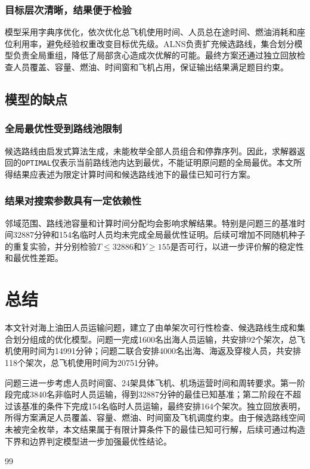 \documentclass[UTF-8,a4paper,zihao=-4]{ctexart}
\begin{document}
\subsubsection{目标层次清晰，结果便于检验}
模型采用字典序优化，依次优化总飞机使用时间、人员总在途时间、燃油消耗和座位利用率，避免经验权重改变目标优先级。ALNS负责扩充候选路线，集合划分模型负责全局重组，降低了局部贪心造成次优解的可能。最终方案还通过独立回放检查人员覆盖、容量、燃油、时间窗和飞机占用，保证输出结果满足题目约束。

\subsection{模型的缺点}
\subsubsection{全局最优性受到路线池限制}
候选路线由启发式算法生成，未能枚举全部人员组合和停靠序列。因此，求解器返回的\texttt{OPTIMAL}仅表示当前路线池内达到最优，不能证明原问题的全局最优。本文所得结果应表述为限定计算时间和候选路线池下的最佳已知可行方案。

\subsubsection{结果对搜索参数具有一定依赖性}
邻域范围、路线池容量和计算时间分配均会影响求解结果。特别是问题三的基准时间$32887$分钟和154名临时人员均未完成全局最优性证明。后续可增加不同随机种子的重复实验，并分别检验$T\leq32886$和$Y\geq155$是否可行，以进一步评价解的稳定性和最优性差距。

\section{总结}
本文针对海上油田人员运输问题，建立了由单架次可行性检查、候选路线生成和集合划分组成的优化模型。问题一完成1600名出海人员运输，共安排92个架次，总飞机使用时间为14991分钟；问题二联合安排4000名出海、海返及穿梭人员，共安排118个架次，总飞机使用时间为20751分钟。

问题三进一步考虑人员时间窗、24架具体飞机、机场运营时间和周转要求。第一阶段完成3840名非临时人员运输，得到32887分钟的最佳已知基准；第二阶段在不超过该基准的条件下完成154名临时人员运输，最终安排164个架次。独立回放表明，所得方案满足人员覆盖、容量、燃油、时间窗及飞机调度约束。由于候选路线空间未被完全枚举，本文结果属于有限计算条件下的最佳已知可行解，后续可通过构造下界和边界判定模型进一步加强最优性结论。

\begin{thebibliography}{99}   %

\end{thebibliography}
\end{document}
